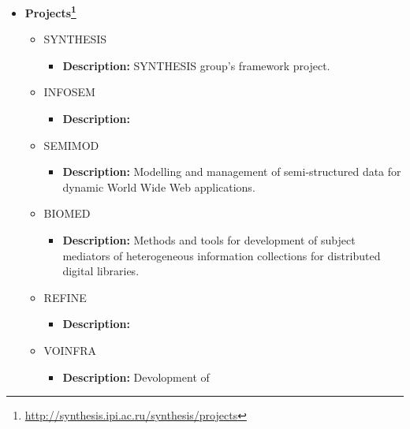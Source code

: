 \documentclass[11pt]{article}
\begin{document}
                \begin{itemize}
                    \item
\textbf{Projects\footnote{\url{http://synthesis.ipi.ac.ru/synthesis/projects}}}
                        \begin{itemize}
                            \item SYNTHESIS
                                \begin{itemize}
                                    \item \textbf{Description:} SYNTHESIS
group's framework project.
                                \end{itemize}
                            \item INFOSEM
                                \begin{itemize}
                                    \item \textbf{Description:}
                                \end{itemize}
                            \item SEMIMOD
                                \begin{itemize}
                                    \item \textbf{Description:} Modelling and
management of semi-structured data for dynamic World Wide Web applications.
                               \end{itemize}
                            \item BIOMED
                                \begin{itemize}
                                    \item \textbf{Description:} Methods and
tools for development of subject mediators of he\-te\-ro\-ge\-neous information
collections for distributed digital libraries.
                               \end{itemize}
                            \item REFINE
                                \begin{itemize}
                                    \item \textbf{Description:}
                               \end{itemize}
                            \item VOINFRA
                                \begin{itemize}
                                    \item \textbf{Description:} Devolopment of

\end{itemize}
\end{itemize}
\end{itemize}
\end{document}
